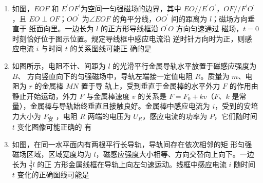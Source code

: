 \begin{enumerate}
\pfourchoices
{}
{}
{}
{}

\item 
{}
如图，$ EOF $ 和 $ E ^{\prime} OF ^{\prime} $为空间一匀强磁场的边界，其中 $ EO // E ^{\prime} O ^{\prime} $，$ OF // F ^{\prime} O ^{\prime} $，且 $ EO \perp OF $；$ OO ^{\prime} $
为$ \angle EOF $ 的角平分线，$ OO ^{\prime} $ 间的距离为 $ l $；磁场方向垂直于
纸面向里。一边长为 $ l $ 的正方形导线框沿 $ O ^{\prime} O $ 方向匀速通过
磁场，$ t=0 $ 时刻恰好位于图示位置。规定导线框中感应电流沿
逆时针方向时为正，则感应电流 $ i $ 与时间 $ t $ 的关系图线可能正
确的是  
\begin{figure}[h!]
\centering

\end{figure}

\pfourchoices
{}
{}
{}
{}



\item
{}
如图所示，电阻不计、间距为 $ l $ 的光滑平行金属导轨水平放置于磁感应强度为 $ B $、
方向竖直向下的匀强磁场中，导轨左端接一定值电阻 $ R $。质量为 $ m $、电阻为 $ r $ 的金属棒 $ MN $ 置于导
轨上，受到垂直于金属棒的水平外力 $ F $ 的作用由静止开始运动，外力 $ F $ 与金属棒速度 $ v $ 的关系是
$ F=F_{0}+kv $（$ F $、$ k $ 是常量），金属棒与导轨始终垂直且接触良好。金属棒中感应电流为 $ i $，受到的安培
力大小为 $ F_{ \text{安} } $ ，电阻 $ R $ 两端的电压为 $ U_{R} $，感应电流的功率为 $ P $，它们随时间 $ t $ 变化图像可能正确的
有  
\begin{figure}[h!]
\centering

\end{figure}

\pfourchoices
{}
{}
{}
{}



\item 
{}
如图，在同一水平面内有两根平行长导轨，导轨间存在依次相邻的矩
形匀强磁场区域，区域宽度均为 $ l $，磁感应强度大小相等、方向交替向上向下。一边长为 $ \frac{ 3 }{ 2 } l $ 的正
方形金属线框在导轨上向左匀速运动。线框中感应电流 $ i $ 随时间 $ t $ 变化的正确图线可能是  
\begin{figure}[h!]
\centering

\end{figure}


\end{enumerate}
